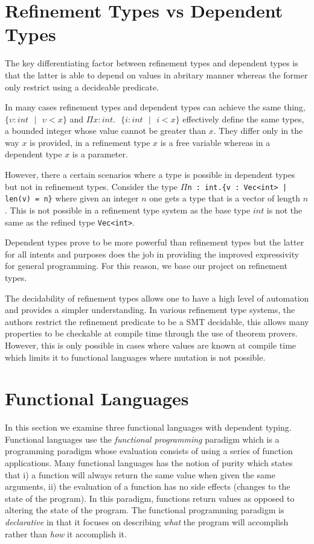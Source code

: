 \documentclass[a4paper,12pt]{report}
\begin{document}
\section{Refinement Types vs Dependent Types}
The key differentiating factor between refinement types and dependent types is 
that the latter is able to depend on values in abritary manner whereas 
the former only restrict using a decideable predicate. 

\par
In many cases refinement types and dependent types can achieve the same thing, 
$\{\upsilon : int \text{ }|\text{ }\upsilon < x\}$ and 
$\Pi x:int.\text{ }\{ i:int\text{ }|\text{ }i < x\}$ effectively define the 
same types, a bounded integer whose value cannot be greater than $x$. They differ 
only in the way $x$ is provided, in a refinement type $x$ is a free variable 
whereas in a dependent type $x$ is a parameter. 

\par
However, there a certain scenarios where a type is possible in dependent types 
but not in refinement types. Consider the type $\Pi$\verb+n : int.{v : Vec<int> | len(v) = n}+
where given an integer $n$ one gets a type that is a vector of length $n$. This 
is not possible in a refinement type system as the base type $int$ is not 
the same as the refined type \verb|Vec<int>|.

\par
Dependent types prove to be more powerful than refinement types but 
the latter for all intents and purposes does the job in 
providing the improved expressivity for general programming. For this reason, we 
base our project on refinement types. 

\par
The decidability of refinement types allows one to have a high level of automation and 
provides a simpler understanding. In various refinement type systems, the authors  
restrict the refinement predicate to be a SMT decidable, this allows many 
properties to be checkable at compile time through the use of theorem provers. 
However, this is only possible in cases where values are known at compile time 
which limits it to functional languages where mutation is not possible. 

\section{Functional Languages}
In this section we examine three functional languages with 
dependent typing. Functional languages 
use the \textit{functional programming} \cite{overviewFP} paradigm which 
is a programming paradigm whose evaluation consists of using a series of function 
applications. Many functional languages has the notion of purity which states that i) 
a function will always return the same value when given the same arguments,  
ii) the evaluation of a function has no side effects (changes to the state of the program).
 In this paradigm, functions return values as opposed to 
altering the state of the program. The functional programming paradigm is 
\emph{declarative} in that it focuses on describing \textit{what} the program 
will accomplish rather than \textit{how} it accomplish it. 
\end{document}
